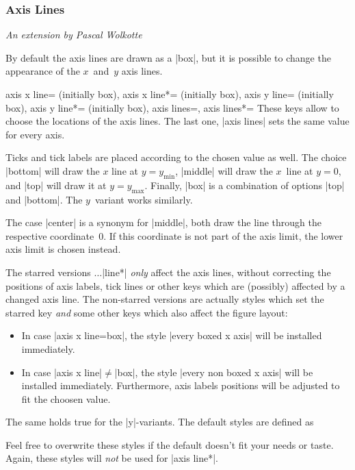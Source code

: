 \subsubsection{Axis Lines}

{\small \emph{An extension by Pascal Wolkotte}}
\vspace{0.4cm}%

\label{sec:pgfplots:axislines}
\noindent By default the axis lines are drawn as a |box|, but it is possible to change the appearance of the $x$~and~$y$ axis lines.

\begin{pgfplotskeylist}{
	axis x line= (initially box),
	axis x line*= (initially box),
	axis y line= (initially box),
	axis y line*= (initially box),
	axis lines=,
	axis lines*=}
	These keys allow to choose the locations of the axis lines. The last one, |axis lines| sets the same value for every axis.

Ticks and tick labels are placed according to the chosen value as well.
The choice |bottom| will draw the $x$ line at $y=y_\text{min}$, |middle| will draw the $x$~line at $y=0$, and |top| will draw it at $y=y_\text{max}$. Finally, |box| is a combination of options |top| and |bottom|. The $y$~variant works similarly.

The case |center| is a synonym for |middle|, both draw the line through the respective coordinate~$0$. If this coordinate is not part of the axis limit, the lower axis limit is chosen instead.


The starred versions $\dotsc$|line*| \emph{only} affect the axis lines, without correcting the positions of axis labels, tick lines or other keys which are (possibly) affected by a changed axis line. The non-starred versions are actually styles which set the starred key \emph{and} some other keys which also affect the figure layout:
\begin{itemize}
	\item In case |axis x line=box|, the style |every boxed x axis| will be installed immediately.
	\item In case |axis x line|$\neq$|box|, the style |every non boxed x axis| will be installed immediately. Furthermore, axis labels positions will be adjusted to fit the choosen value.
\end{itemize}
The same holds true for the |y|-variants. The default styles are defined as
\begin{codeexample}
\end{codeexample}
Feel free to overwrite these styles if the default doesn't fit your needs or taste. Again, these styles will \emph{not} be used for |axis line*|. 


\end{pgfplotskeylist}
